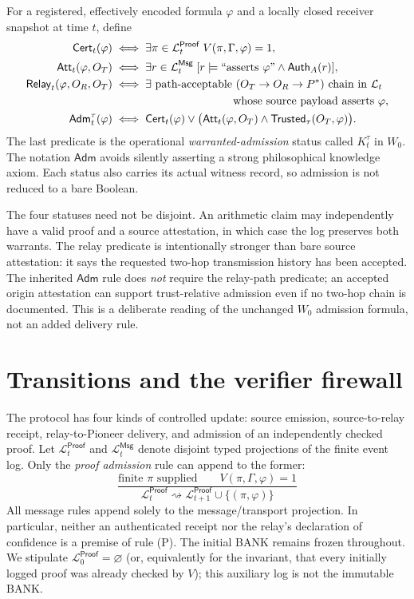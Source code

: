 \documentclass[11pt,letterpaper]{article}
\newcommand{\Cert}{\mathsf{Cert}}\newcommand{\Att}{\mathsf{Att}}\newcommand{\Relay}{\mathsf{Relay}}\newcommand{\Auth}{\mathsf{Auth}}\newcommand{\Trust}{\mathsf{Trusted}}\newcommand{\Adm}{\mathsf{Adm}}\newcommand{\Proof}{\mathsf{Proof}}\newcommand{\Msg}{\mathsf{Msg}}\newcommand{\Log}{\mathcal L}\newcommand{\N}{\mathbb N}
\begin{document}
\begin{definition}
For a registered, effectively encoded formula $\varphi$ and a locally closed receiver snapshot at time $t$, define
\begin{align*}
\Cert_t(\varphi)&\iff \exists\pi\in\Log_t^{\Proof}\;V(\pi,\Gamma,\varphi)=1,\\
\Att_t(\varphi,O_T)&\iff \exists r\in\Log_t^{\Msg}\;[r\models\text{``asserts $\varphi$''}\wedge \Auth_A(r)],\\
\Relay_t(\varphi,O_R,O_T)&\iff \exists\text{ path-acceptable }(O_T\to O_R\to P^*)\text{ chain in }\Log_t\\
&\hspace{38mm}\text{whose source payload asserts }\varphi,\\
\Adm_t^\tau(\varphi)&\iff \Cert_t(\varphi)\vee\bigl(\Att_t(\varphi,O_T)\wedge\Trust_\tau(O_T,\varphi)\bigr).
\end{align*}
The last predicate is the operational \emph{warranted-admission} status called $K_t^\tau$ in $W_0$. The notation $\Adm$ avoids silently asserting a strong philosophical knowledge axiom. Each status also carries its actual witness record, so admission is not reduced to a bare Boolean.
\end{definition}
The four statuses need not be disjoint. An arithmetic claim may independently have a valid proof and a source attestation, in which case the log preserves both warrants. The relay predicate is intentionally stronger than bare source attestation: it says the requested two-hop transmission history has been accepted. The inherited $\Adm$ rule does \emph{not} require the relay-path predicate; an accepted origin attestation can support trust-relative admission even if no two-hop chain is documented. This is a deliberate reading of the unchanged $W_0$ admission formula, not an added delivery rule.

\section{Transitions and the verifier firewall}
The protocol has four kinds of controlled update: source emission, source-to-relay receipt, relay-to-Pioneer delivery, and admission of an independently checked proof. Let $\Log_t^{\Proof}$ and $\Log_t^{\Msg}$ denote disjoint typed projections of the finite event log. Only the \emph{proof admission} rule can append to the former:
\[
\frac{\text{finite $\pi$ supplied}\qquad V(\pi,\Gamma,\varphi)=1}
     {\Log_t^{\Proof}\rightsquigarrow \Log_{t+1}^{\Proof}\cup\{(\pi,\varphi)\}}\tag{P}
\]
All message rules append solely to the message/transport projection. In particular, neither an authenticated receipt nor the relay's declaration of confidence is a premise of rule (P). The initial BANK remains frozen throughout. We stipulate $\Log_0^{\Proof}=\varnothing$ (or, equivalently for the invariant, that every initially logged proof was already checked by $V$); this auxiliary log is not the immutable BANK.
\end{document}
